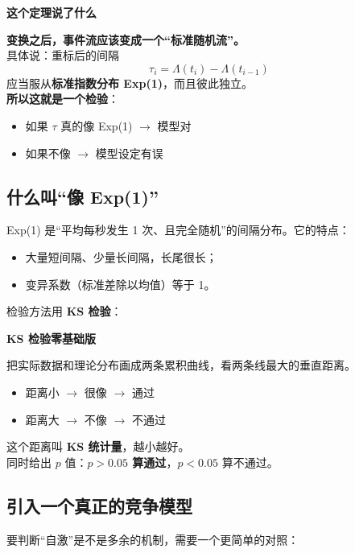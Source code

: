 \documentclass[UTF8,a4paper,11pt]{ctexart}
\newenvironment{explainbox}[1]
{\begin{center}\begin{minipage}{0.94\textwidth}\colorbox{boxbg}{\parbox{0.92\textwidth}{\textbf{#1}\par\vspace{2pt}}}}
{\end{minipage}\end{center}}
\newcommand{\term}[1]{\textbf{#1}}
\begin{document}
\begin{explainbox}{这个定理说了什么}
\textbf{变换之后，事件流应该变成一个“标准随机流”。}\\
具体说：重标后的间隔
\begin{equation*}
\tau_i = \Lambda(t_i) - \Lambda(t_{i-1})
\end{equation*}
应当服从\textbf{标准指数分布 Exp(1)}，而且彼此独立。\\[4pt]
\textbf{所以这就是一个检验}：
\begin{itemize}[leftmargin=1.4em,itemsep=1pt]
\item 如果 $\tau$ 真的像 Exp(1) $\to$ 模型对
\item 如果不像 $\to$ 模型设定有误
\end{itemize}
\end{explainbox}

\subsection{什么叫“像 Exp(1)”}

Exp(1) 是“平均每秒发生 1 次、且完全随机”的间隔分布。它的特点：

\begin{itemize}[leftmargin=1.6em]
\item 大量短间隔、少量长间隔，长尾很长；
\item 变异系数（标准差除以均值）等于 1。
\end{itemize}

检验方法用 \term{KS 检验}：

\begin{explainbox}{KS 检验零基础版}
把实际数据和理论分布画成两条累积曲线，看两条线最大的垂直距离。\\[4pt]
\begin{itemize}[leftmargin=1.4em,itemsep=1pt]
\item 距离小 $\to$ 很像 $\to$ 通过
\item 距离大 $\to$ 不像 $\to$ 不通过
\end{itemize}
这个距离叫 \term{KS 统计量}，越小越好。\\
同时给出 $p$ 值：\textbf{$p > 0.05$ 算通过}，$p < 0.05$ 算不通过。
\end{explainbox}

\subsection{引入一个真正的竞争模型}

要判断“自激”是不是多余的机制，需要一个更简单的对照：
\end{document}
